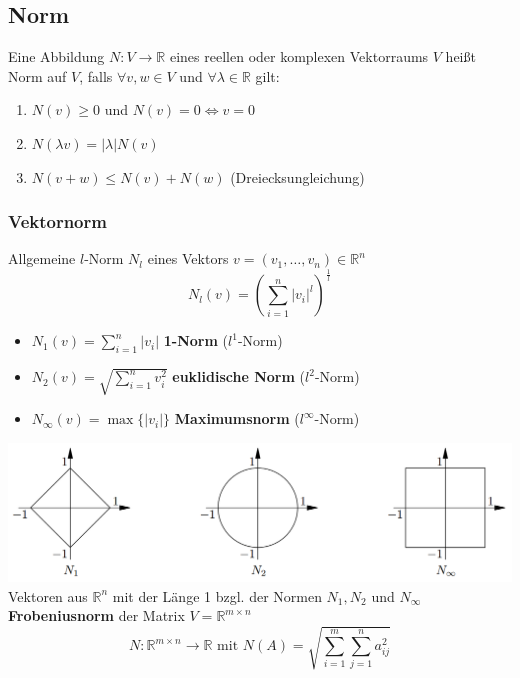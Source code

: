 \documentclass[6pt,a4paper]{scrartcl}
\newcommand{\abs}[1]{\ensuremath{\left\vert#1\right\vert}}
\newcommand{\enbrace}[1]{\ensuremath{\left(#1\right)}}
\begin{document}
\begin{multicols*}{4}
\subsection{Norm}
Eine Abbildung $N: V\rightarrow \mathbb{R}$ eines reellen oder komplexen Vektorraums $V$ heißt Norm auf $V$, falls $\forall v,w\in V$ und $\forall \lambda\in\mathbb{R}$ gilt:
\begin{enumerate}\itemsep0pt
\item $N(v)\ge0$ \quad und \quad $N(v)=0 \Leftrightarrow v=0$
\item $N(\lambda v)=\abs{\lambda}N(v)$
\item $N(v+w)\le N(v) + N(w)$ \quad (Dreiecksungleichung)
\end{enumerate}
\subsubsection{Vektornorm}
Allgemeine $l$-Norm $N_l$ eines Vektors $v=(v_1,\dots,v_n)\in \mathbb{R}^n$
\begin{equation*}
N_l(v)=\enbrace{\sum_{i=1}^{n}\abs{v_i}^l}^{\frac{1}{l}}
\end{equation*}
\begin{itemize}\itemsep0pt
\item $N_1(v)=\sum_{i=1}^{n}\abs{v_i}$ \qquad  \textbf{1-Norm} ($l^1$-Norm) \\
\item $N_2(v)=\sqrt{\sum_{i=1}^{n}v_i^2}$ \qquad  \textbf{euklidische Norm} ($l^2$-Norm)
\item $N_\infty(v)=\max\{\abs{v_i}\}$ \qquad \textbf{Maximumsnorm} ($l^\infty$-Norm)
\end{itemize}
\includegraphics[width=\linewidth]{./img/norms.png} \\
Vektoren aus $\mathbb{R}^n$ mit der Länge 1 bzgl. der Normen $N_1, N_2$ und $N_\infty$\\
\textbf{Frobeniusnorm} der Matrix $V=\mathbb{R}^{m\times n}$
\begin{equation*} 
N:\mathbb{R}^{m\times n}\rightarrow\mathbb{R} \text{ mit } N(A)=\sqrt{\sum_{i=1}^{m}\sum_{j=1}^{n}a_{ij}^2}
\end{equation*}

\end{multicols*}
\end{document}

